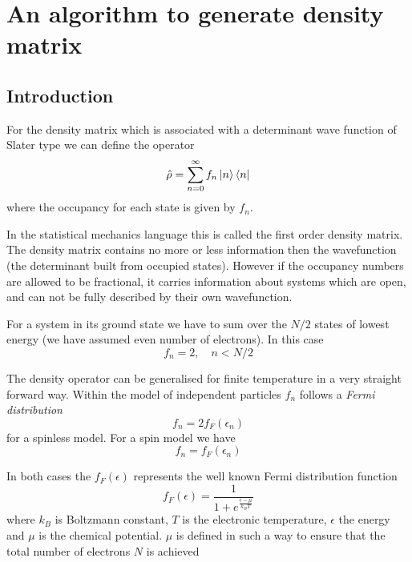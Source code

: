 \section{An algorithm to generate density matrix}
\subsection{Introduction}
\par{For the density matrix which is associated with a determinant wave function of Slater type
we can define the operator}
\begin{equation}
{\hat\rho}=\sum_{n=0}^{\infty}f_n\mathinner{|{n}\rangle}\mathinner{\langle{n}|}
\end{equation}
where the occupancy for each state is given by $f_n$.
\par{In the statistical mechanics language this is called the first order
density matrix. The density matrix contains no more or less information
then the wavefunction (the determinant built from occupied states).
However if the occupancy numbers are allowed to be fractional, it carries information
about systems which are open, and can not be fully described by their own wavefunction.}
\par{For a system in its ground state we have to sum over the $N/2$ states of lowest energy
(we have assumed even number of electrons). In this case }
\begin{equation}
f_n=2, \quad n<N/2
\end{equation}
\par{The density operator can be generalised for finite temperature in a very straight forward way. Within the
model of independent particles $f_n$ follows a \emph {Fermi distribution}}
\begin{equation}
f_{n}=2f_F(\epsilon_n)
\end{equation}
for a spinless model. For a spin model we have
\begin{equation}
f_{n}=f_F(\epsilon_n)
\end{equation}
\par{In both cases the $f_F(\epsilon)$ represents the well known Fermi distribution function}
\begin{equation}
\label{fermidistribution}
f_F(\epsilon)=\frac{1}{1+e^{\frac{\epsilon-\mu}{k_BT}}}
\end{equation}
where $k_B$ is Boltzmann constant, $T$ is the electronic temperature, $\epsilon$ the energy
and $\mu$ is the chemical potential. $\mu$ is defined in such a way to ensure that
the total number of electrons $N$ is achieved
